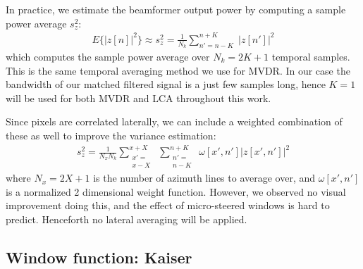 \documentclass[10pt,journal,draftclsnofoot,onecolumn]{IEEEtran}
\newcommand\nmat[1]{\begin{matrix}#1\end{matrix}}
\newcommand\sumb[2]{\sum\limits_{#1}^{#2}\;}
\newcommand\1{\vec 1}
\begin{document}
In practice, we estimate the beamformer output power by computing a sample power average $s_z^2$:
%
\begin{align*}
E\big\{\big|z[n]\big|^2\big\} \approx s_z^2 = \frac{1}{N_k} \sumb{n'=n-K}{n+K} \big| z[n'] \big|^2
\end{align*}
%
which computes the sample power average over $N_k=2K+1$ temporal samples. This is the same temporal averaging method we use for MVDR. In our case the bandwidth of our matched filtered signal is a just few samples long, hence $K=1$ will be used for both MVDR and LCA throughout this work.

Since pixels are correlated laterally, we can include a weighted combination of these as well to improve the variance estimation:
%
\begin{align}
s_z^2 = \frac{1}{N_x N_k} \sumb{\nmat{\scriptstyle x'=\\[-2mm]\scriptstyle x-X}}{x+X} \sumb{\nmat{\scriptstyle n'=\\[-2mm]\scriptstyle n-K}}{n+K} \omega[x',n']\big| z[x',n'] \big|^2
\end{align}
%
where $N_x = 2X+1$ is the number of azimuth lines to average over, and $\omega[x',n']$ is a normalized 2 dimensional weight function. However, we observed no visual improvement doing this, and the effect of micro-steered windows is hard to predict. Henceforth no lateral averaging will be applied.
% 


\subsection{Window function: Kaiser}\label{sec:lca_kaiser_windows}
\end{document}
